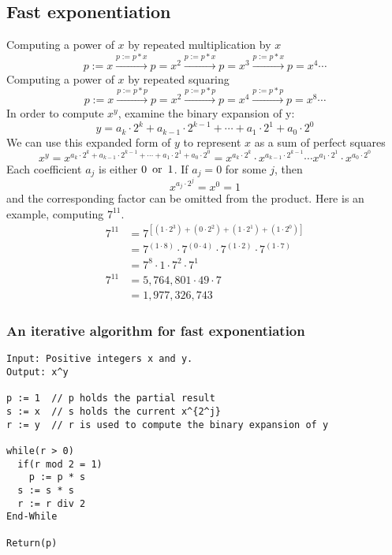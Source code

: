 \subsection{Fast exponentiation}
Computing a power of $x$ by repeated multiplication by $x$
\[
    p:=x \xrightarrow{p:=p*x} p = x^2 \xrightarrow{p:=p*x} p = x^3 \xrightarrow{p:=p*x} p=x^4 \cdots
\]
Computing a power of $x$ by repeated squaring
\[
    p:=x \xrightarrow{p:=p*p} p=x^2 \xrightarrow{p:=p*p} p=x^4 \xrightarrow{p:=p*p} p=x^8 \cdots
\]
In order to compute $x^y$, examine the binary expansion of y:
\[
    y = a_k \cdot 2^k + a_{k-1} \cdot 2^{k-1} + \cdots + a_1 \cdot 2^1 + a_0 \cdot 2^0
\]
We can use this expanded form of $y$ to represent $x$ as a sum of perfect squares
\[
    x^y = x^{a_k \cdot 2^k + a_{k-1} \cdot 2^{k-1} + \cdots + a_1 \cdot 2^1 + a_0 \cdot 2^0} = x^{a_{k} \cdot 2^{k}} \cdot x^{a_{k-1} \cdot 2^{k-1}} \cdots x^{a_{1} \cdot 2^{1}} \cdot x^{a_{0} \cdot 2^{0}}
\]
Each coefficient $a_j$ is either $0 \operatorname{~\text{or}~} 1$. If $a_j = 0$ for some $j$, then
\[
    x^{a_j \cdot 2^j} = x^0 = 1
\]
and the corresponding factor can be omitted from the product. Here is an example, computing $7^{11}$.
\begin{align*}
    7^{11} & = 7^{[(1 \cdot 2^3) + (0 \cdot 2^2) + (1 \cdot 2^1) + (1 \cdot 2^0)]}               \\
           & = 7^{(1 \cdot 8)} \cdot 7^{(0 \cdot 4)} \cdot 7^{(1 \cdot 2)} \cdot 7^{(1 \cdot 7)} \\
           & = 7^8 \cdot 1 \cdot 7^2 \cdot 7^1                                                   \\
    7^11   & = 5,764,801 \cdot 49 \cdot 7                                                        \\
           & = 1,977,326,743
\end{align*}

\subsubsection*{An iterative algorithm for fast exponentiation}
\begin{lstlisting}
Input: Positive integers x and y.
Output: x^y

p := 1  // p holds the partial result
s := x  // s holds the current x^{2^j}
r := y  // r is used to compute the binary expansion of y

while(r > 0)
  if(r mod 2 = 1)
    p := p * s
  s := s * s
  r := r div 2
End-While

Return(p)
\end{lstlisting}

